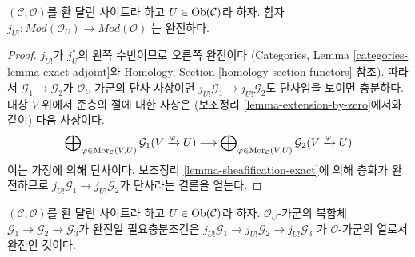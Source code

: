 \begin{lemma}
\label{lemma-extension-by-zero-exact}
$(\mathcal{C}, \mathcal{O})$를 환 달린 사이트라 하고
$U \in \mathop{\mathrm{Ob}}\nolimits(\mathcal{C})$라 하자. 함자
$j_{U!} : \textit{Mod}(\mathcal{O}_U) \to \textit{Mod}(\mathcal{O})$
는 완전하다.
\end{lemma}

\begin{proof}
$j_{U!}$가 $j_U^*$의 왼쪽 수반이므로 오른쪽 완전이다
(Categories, Lemma \ref{categories-lemma-exact-adjoint}와
Homology, Section \ref{homology-section-functors} 참조).
따라서 $\mathcal{G}_1 \to \mathcal{G}_2$가 $\mathcal{O}_U$-가군의
단사 사상이면 $j_{U!}\mathcal{G}_1 \to j_{U!}\mathcal{G}_2$도 단사임을
보이면 충분하다. 대상 $V$ 위에서 준층의 절에 대한 사상은
(보조정리 \ref{lemma-extension-by-zero}에서와 같이) 다음 사상이다.
$$
\bigoplus\nolimits_{\varphi \in \mathop{\mathrm{Mor}}\nolimits_\mathcal{C}(V, U)}
\mathcal{G}_1(V \xrightarrow{\varphi} U)
\longrightarrow
\bigoplus\nolimits_{\varphi \in \mathop{\mathrm{Mor}}\nolimits_\mathcal{C}(V, U)}
\mathcal{G}_2(V \xrightarrow{\varphi} U)
$$
이는 가정에 의해 단사이다. 보조정리 \ref{lemma-sheafification-exact}에
의해 층화가 완전하므로
$j_{U!}\mathcal{G}_1 \to j_{U!}\mathcal{G}_2$가 단사라는 결론을 얻는다.
\end{proof}

\begin{lemma}
\label{lemma-j-shriek-reflects-exactness}
$(\mathcal{C}, \mathcal{O})$를 환 달린 사이트라 하고
$U \in \mathop{\mathrm{Ob}}\nolimits(\mathcal{C})$라 하자. $\mathcal{O}_U$-가군의 복합체
$\mathcal{G}_1 \to \mathcal{G}_2 \to \mathcal{G}_3$가 완전일 필요충분조건은
$j_{U!}\mathcal{G}_1 \to j_{U!}\mathcal{G}_2 \to j_{U!}\mathcal{G}_3$
가 $\mathcal{O}$-가군의 열로서 완전인 것이다.
\end{lemma}

